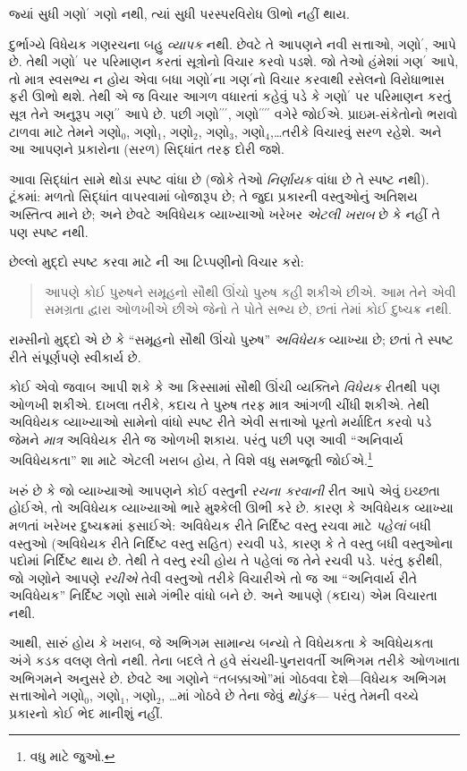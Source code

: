 \documentclass[../../../include/open-logic-section]{subfiles}
\begin{document}
જ્યાં સુધી ગણો$^{\prime}$ ગણો નથી, ત્યાં સુધી પરસ્પરવિરોધ ઊભો નહીં થાય.

દુર્ભાગ્યે વિધેયક ગણરચના બહુ \emph{વ્યાપક} નથી. છેવટે તે આપણને
નવી સત્તાઓ, ગણો$^\prime$, આપે છે. તેથી ગણો$^\prime$ પર પરિમાણન
કરતાં સૂત્રોનો વિચાર કરવો પડશે. જો તેઓ હંમેશાં ગણ$^\prime$ આપે,
તો માત્ર સ્વસભ્ય ન હોય એવા બધા ગણો$^\prime$ના ગણ$^\prime$નો
વિચાર કરવાથી રસેલનો વિરોધાભાસ ફરી ઊભો થશે. તેથી એ જ વિચાર
આગળ વધારતાં કહેવું પડે કે ગણો$^\prime$ પર પરિમાણન કરતું સૂત્ર
તેને અનુરૂપ ગણ$^{\prime\prime}$ આપે છે. પછી
ગણો$^{\prime\prime\prime}$,
ગણો$^{\prime\prime\prime\prime}$ વગેરે જોઈએ.
પ્રાઇમ-સંકેતોનો ભરાવો ટાળવા માટે તેમને ગણો$_0$, ગણો$_1$, ગણો$_2$,
ગણો$_3$, ગણો$_4$,\ldots તરીકે વિચારવું સરળ રહેશે. અને આ આપણને
પ્રકારોના (સરળ) સિદ્ધાંત તરફ દોરી જશે.

આવા સિદ્ધાંત સામે થોડા સ્પષ્ટ વાંધા છે (જોકે તેઓ
\emph{નિર્ણાયક} વાંધા છે તે સ્પષ્ટ નથી). ટૂંકમાં: મળતો સિદ્ધાંત
વાપરવામાં બોજારૂપ છે; તે જુદા પ્રકારની વસ્તુઓનું અતિશય અસ્તિત્વ
માને છે; અને છેવટે અવિધેયક વ્યાખ્યાઓ ખરેખર \emph{એટલી ખરાબ}
છે કે નહીં તે પણ સ્પષ્ટ નથી.

છેલ્લો મુદ્દો સ્પષ્ટ કરવા માટે \citeauthor{Ramsey1925}ની આ
ટિપ્પણીનો વિચાર કરો:
\begin{quote}
આપણે કોઈ પુરુષને સમૂહનો સૌથી ઊંચો પુરુષ કહી શકીએ છીએ. આમ તેને
એવી સમગ્રતા દ્વારા ઓળખીએ છીએ જેનો તે પોતે સભ્ય છે, છતાં તેમાં
કોઈ દુષ્ચક્ર નથી. \citep{Ramsey1925}
\end{quote}
રામ્સીનો મુદ્દો એ છે કે ``સમૂહનો સૌથી ઊંચો પુરુષ'' \emph{અવિધેયક}
વ્યાખ્યા છે; છતાં તે સ્પષ્ટ રીતે સંપૂર્ણપણે સ્વીકાર્ય છે.

કોઈ એવો જવાબ આપી શકે કે આ કિસ્સામાં સૌથી ઊંચી વ્યક્તિને
\emph{વિધેયક} રીતથી પણ ઓળખી શકીએ. દાખલા તરીકે, કદાચ તે પુરુષ
તરફ માત્ર આંગળી ચીંધી શકીએ. તેથી અવિધેયક વ્યાખ્યાઓ સામેનો વાંધો
સ્પષ્ટ રીતે એવી સત્તાઓ પૂરતો મર્યાદિત કરવો પડે જેમને
\emph{માત્ર} અવિધેયક રીતે જ ઓળખી શકાય. પરંતુ પછી પણ આવી
``અનિવાર્ય અવિધેયકતા'' શા માટે એટલી ખરાબ હોય, તે વિશે વધુ
સમજૂતી જોઈએ.\footnote{વધુ માટે \citet{Linnebo2010} જુઓ.}

ખરું છે કે જો વ્યાખ્યાઓ આપણને કોઈ વસ્તુની \emph{રચના કરવાની}
રીત આપે એવું ઇચ્છતા હોઈએ, તો અવિધેયક વ્યાખ્યાઓ ભારે મુશ્કેલી
ઊભી કરે છે. કારણ કે અવિધેયક વ્યાખ્યા મળતાં ખરેખર દુષ્ચક્રમાં
ફસાઈએ: અવિધેયક રીતે નિર્દિષ્ટ વસ્તુ રચવા માટે \emph{પહેલાં}
બધી વસ્તુઓ (અવિધેયક રીતે નિર્દિષ્ટ વસ્તુ સહિત) રચવી પડે, કારણ
કે તે વસ્તુ બધી વસ્તુઓના પદોમાં નિર્દિષ્ટ થાય છે. તેથી તે વસ્તુ
રચી હોય તે પહેલાં જ તેને રચવી પડે. પરંતુ ફરીથી, જો ગણોને આપણે
\emph{રચીએ} તેવી વસ્તુઓ તરીકે વિચારીએ તો જ આ ``અનિવાર્ય રીતે
અવિધેયક'' નિર્દિષ્ટ ગણો સામે ગંભીર વાંધો બને છે. અને આપણે
(કદાચ) એમ વિચારતા નથી.

આથી, સારું હોય કે ખરાબ, જે અભિગમ સામાન્ય બન્યો તે વિધેયકતા કે
અવિધેયકતા અંગે કડક વલણ લેતો નથી. તેના બદલે તે હવે સંચયી-પુનરાવર્તી
અભિગમ તરીકે ઓળખાતા અભિગમને અનુસરે છે. છેવટે આ ગણોને
``તબક્કાઓ''માં ગોઠવવા દેશે---વિધેયક અભિગમ સત્તાઓને ગણો$_0$,
ગણો$_1$, ગણો$_2$, \ldots{}માં ગોઠવે છે તેના જેવું \emph{થોડુંક}---
પરંતુ તેમની વચ્ચે પ્રકારનો કોઈ ભેદ માનીશું નહીં.
\end{document}
